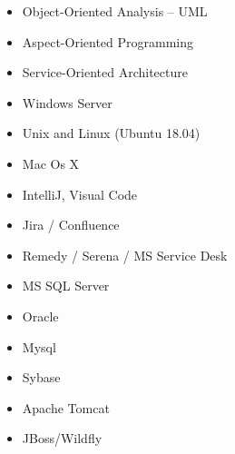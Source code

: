 \documentclass[11pt,a4paper,sans]{moderncv}        %
\begin{document}
\begin{cvcolumns}
	{\begin{itemize}
            \item Object-Oriented Analysis – UML 
            \item Aspect-Oriented Programming  
            \item Service-Oriented Architecture 
    \end{itemize}}
	{\begin{itemize}
            \item Windows Server  
            \item Unix and Linux (Ubuntu 18.04) 
            \item Mac Os X 
    \end{itemize}}
    \end{cvcolumns} 
    \begin{cvcolumns}
	{\begin{itemize}
            \item IntelliJ, Visual Code 
            \item Jira / Confluence 
            \item Remedy / Serena / MS Service Desk 
    \end{itemize}
    }
	{\begin{itemize}
            \item MS SQL Server
            \item Oracle
            \item Mysql
            \item Sybase
    \end{itemize}}
 \end{cvcolumns} 
   \begin{cvcolumns}
	{\begin{itemize}
            \item Apache Tomcat 
            \item JBoss/Wildfly 
    \end{itemize}}
 \end{cvcolumns} 

\nocite{*}
%

\clearpage
\Large
\end{document}
